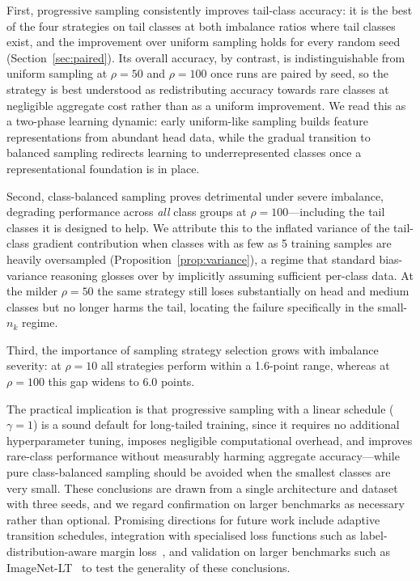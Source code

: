 \documentclass[12pt,a4paper]{article}
\begin{document}
First, progressive sampling consistently improves tail-class accuracy: it is the best of the four strategies on tail classes at both imbalance ratios where tail classes exist, and the improvement over uniform sampling holds for every random seed (Section~\ref{sec:paired}). Its overall accuracy, by contrast, is indistinguishable from uniform sampling at $\rho = 50$ and $\rho = 100$ once runs are paired by seed, so the strategy is best understood as redistributing accuracy towards rare classes at negligible aggregate cost rather than as a uniform improvement. We read this as a two-phase learning dynamic: early uniform-like sampling builds feature representations from abundant head data, while the gradual transition to balanced sampling redirects learning to underrepresented classes once a representational foundation is in place.

Second, class-balanced sampling proves detrimental under severe imbalance, degrading performance across \emph{all} class groups at $\rho = 100$---including the tail classes it is designed to help. We attribute this to the inflated variance of the tail-class gradient contribution when classes with as few as 5 training samples are heavily oversampled (Proposition~\ref{prop:variance}), a regime that standard bias-variance reasoning glosses over by implicitly assuming sufficient per-class data. At the milder $\rho = 50$ the same strategy still loses substantially on head and medium classes but no longer harms the tail, locating the failure specifically in the small-$n_k$ regime.

Third, the importance of sampling strategy selection grows with imbalance severity: at $\rho = 10$ all strategies perform within a 1.6-point range, whereas at $\rho = 100$ this gap widens to 6.0 points.

The practical implication is that progressive sampling with a linear schedule ($\gamma = 1$) is a sound default for long-tailed training, since it requires no additional hyperparameter tuning, imposes negligible computational overhead, and improves rare-class performance without measurably harming aggregate accuracy---while pure class-balanced sampling should be avoided when the smallest classes are very small. These conclusions are drawn from a single architecture and dataset with three seeds, and we regard confirmation on larger benchmarks as necessary rather than optional. Promising directions for future work include adaptive transition schedules, integration with specialised loss functions such as label-distribution-aware margin loss~\citep{cao2019learning}, and validation on larger benchmarks such as ImageNet-LT~\citep{liu2019large} to test the generality of these conclusions.
\end{document}
